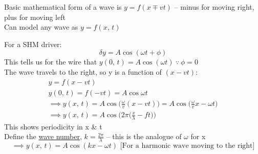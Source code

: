 \documentclass[a4paper, 11pt, fleqn, normalem]{report}
\begin{document}
Basic mathematical form of a wave is $y = f(x \mp vt)$ -- minus for moving right, plus for moving left \\
Can model any wave as $y = f(x,\,t)$

For a SHM driver:
\begin{equation*}
    {\delta}y = A\cos{({\omega}t + \phi)}
\end{equation*}
This tells us for the wire that $y(0,\,t) = A\cos{({\omega}t)} ~\because~ \phi = 0$ \\
The wave travels to the right, so y is a function of $(x-vt)$:
\begin{gather*}
    y = f(x-vt) \\
    y(0,\,t) = f(-vt) = A\cos{{\omega}t} \\
    \implies y(x,\,t) = A\cos{\Big(\frac{\omega}{v}(x-vt)\Big)} = A\cos{\Big(\frac{\omega}{v}x - {\omega}t\Big)} \\
    \implies y(x,\,t) = A\cos{\Big(2\pi\Big(\frac{x}{\lambda} - ft\Big)\Big)}
\end{gather*}
This shows periodicity in x \& t \\
Define the \underline{wave number}, $k = \frac{2\pi}{\lambda}$ -- this is the analogue of $\omega$ for x
\begin{equation*}
    \implies y(x,\,t) = A\cos{(kx - {\omega}t)} \text{ [For a harmonic wave moving to the right]}
\end{equation*}
\end{document}

